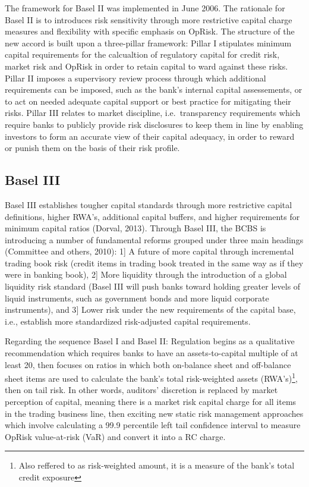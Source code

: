 \documentclass[]{DissertateUSU}
\let\rmarkdownfootnote\footnote%
\def\footnote{\protect\rmarkdownfootnote}
\begin{document}
The framework for Basel II was implemented in June 2006. The rationale
for Basel II is to introduces risk sensitivity through more restrictive
capital charge measures and flexibility with specific emphasis on
OpRisk. The structure of the new accord is built upon a three-pillar
framework: Pillar I stipulates minimum capital requirements for the
calcualtion of regulatory capital for credit risk, market risk and
OpRisk in order to retain capital to ward against these risks. Pillar II
imposes a supervisory review process through which additional
requirements can be imposed, such as the bank's internal capital
assessements, or to act on needed adequate capital support or best
practice for mitigating their risks. Pillar III relates to market
discipline, i.e.~transparency requirements which require banks to
publicly provide risk disclosures to keep them in line by enabling
investors to form an accurate view of their capital adequacy, in order
to reward or punish them on the basis of their risk profile.\medskip

\subsection{Basel III}

Basel III establishes tougher capital standards through more restrictive
capital definitions, higher RWA's, additional capital buffers, and
higher requirements for minimum capital ratios (Dorval, 2013). Through
Basel III, the BCBS is introducing a number of fundamental reforms
grouped under three main headings (Committee and others, 2010): 1{]} A
future of more capital through incremental trading book risk (credit
items in trading book treated in the same way as if they were in banking
book), 2{]} More liquidity through the introduction of a global
liquidity risk standard (Basel III will push banks toward holding
greater levels of liquid instruments, such as government bonds and more
liquid corporate instruments), and 3{]} Lower risk under the new
requirements of the capital base, i.e., establish more standardized
risk-adjusted capital requirements.\medskip

Regarding the sequence Basel I and Basel II: Regulation begins as a
qualitative recommendation which requires banks to have an
assets-to-capital multiple of at least 20, then focuses on ratios in
which both on-balance sheet and off-balance sheet items are used to
calculate the bank's total risk-weighted assets
(RWA's)\footnote{Also reffered to as risk-weighted amount, it is a measure of the bank's total credit exposure},
then on tail risk. In other words, auditors' discretion is replaced by
market perception of capital, meaning there is a market risk capital
charge for all items in the trading business line, then exciting new
static risk management approaches which involve calculating a 99.9
percentile left tail confidence interval to measure OpRisk value-at-risk
(VaR) and convert it into a RC charge.\medskip 
\end{document}
